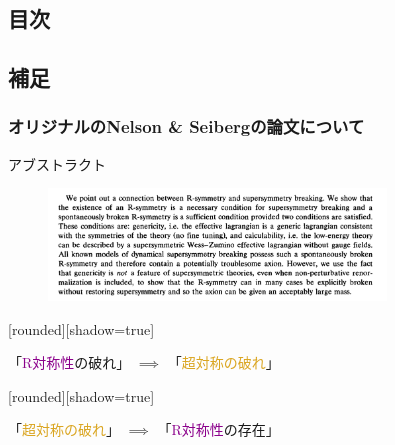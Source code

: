 \documentclass[
  unicode,a4paper,9pt,
  xcolor = {dvipsnames,svgnames},
  hyperref ={colorlinks=true,citecolor=Navy,linkcolor=NavyBlue,urlcolor=purple},
  ja=standard,lualatex
]{beamer}
\begin{document}
\subsection{目次}

\begin{frame}{\subsecname}
  \tableofcontents
\end{frame}


\subsection{補足}

\begin{frame}
  \frametitle{オリジナルのNelson \& Seibergの論文について}
  アブストラクト

  \begin{figure}
    \centering
    \includegraphics[width=0.8\textwidth]{fig/Nelson1993nfabst.PNG}
  \end{figure}

  [rounded][shadow=true]
  \begin{block}{}
    \centering
    「\textcolor{DarkMagenta}{R対称性}の破れ」
    $\implies$
    「\textcolor{Goldenrod}{超対称の破れ}」
  \end{block}
  [rounded][shadow=true]
  \begin{block}{}
    \centering
    「\textcolor{Goldenrod}{超対称の破れ}」
    $\implies$
    「\textcolor{DarkMagenta}{R対称性}の存在」
  \end{block}

\end{frame}
\end{document}
